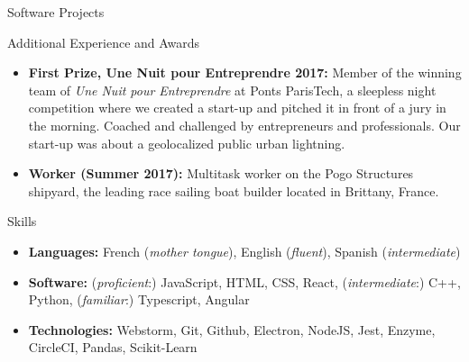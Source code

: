 \documentclass[]{mcdowellcv}
\begin{document}
\begin{cvsection}{Software Projects}
    \end{cvsection}

    \begin{cvsection}{Additional Experience and Awards}
        \begin{cvsubsection}{}{}{}
            \begin{itemize}

                \item \textbf{First Prize, Une Nuit pour Entreprendre 2017:} Member of the winning team of \textit{Une Nuit pour Entreprendre} at Ponts ParisTech, a sleepless
                night competition where we created a start-up and pitched it in front of a jury in the morning.
                Coached and challenged by entrepreneurs and professionals.
                Our start-up was about a geolocalized public urban lightning.

                \item \textbf{Worker (Summer 2017):} Multitask worker on the Pogo Structures shipyard, the leading race sailing boat builder located in Brittany, France.

            \end{itemize}
        \end{cvsubsection}
    \end{cvsection}

    \begin{cvsection}{Skills}
        \begin{cvsubsection}{}{}{}
            \begin{itemize}
                \item \textbf{Languages:} French (\textit{mother tongue}), English (\textit{fluent}), Spanish (\textit{intermediate})
                \item \textbf{Software:} (\textit{proficient}:) JavaScript, HTML, CSS, React, (\textit{intermediate}:) C++, Python, (\textit{familiar}:) Typescript, Angular
                \item \textbf{Technologies:} Webstorm, Git, Github, Electron, NodeJS, Jest, Enzyme, CircleCI, Pandas, Scikit-Learn
            \end{itemize}
        \end{cvsubsection}
    \end{cvsection}
\end{document}
